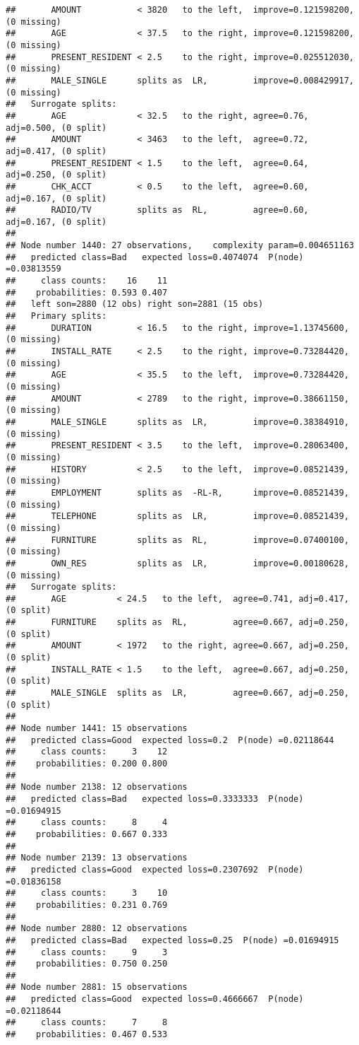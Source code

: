 \documentclass[
]{article}
\begin{document}
\begin{verbatim}
##       AMOUNT           < 3820   to the left,  improve=0.121598200, (0 missing)
##       AGE              < 37.5   to the right, improve=0.121598200, (0 missing)
##       PRESENT_RESIDENT < 2.5    to the right, improve=0.025512030, (0 missing)
##       MALE_SINGLE      splits as  LR,         improve=0.008429917, (0 missing)
##   Surrogate splits:
##       AGE              < 32.5   to the right, agree=0.76, adj=0.500, (0 split)
##       AMOUNT           < 3463   to the left,  agree=0.72, adj=0.417, (0 split)
##       PRESENT_RESIDENT < 1.5    to the left,  agree=0.64, adj=0.250, (0 split)
##       CHK_ACCT         < 0.5    to the left,  agree=0.60, adj=0.167, (0 split)
##       RADIO/TV         splits as  RL,         agree=0.60, adj=0.167, (0 split)
## 
## Node number 1440: 27 observations,    complexity param=0.004651163
##   predicted class=Bad   expected loss=0.4074074  P(node) =0.03813559
##     class counts:    16    11
##    probabilities: 0.593 0.407 
##   left son=2880 (12 obs) right son=2881 (15 obs)
##   Primary splits:
##       DURATION         < 16.5   to the right, improve=1.13745600, (0 missing)
##       INSTALL_RATE     < 2.5    to the right, improve=0.73284420, (0 missing)
##       AGE              < 35.5   to the left,  improve=0.73284420, (0 missing)
##       AMOUNT           < 2789   to the right, improve=0.38661150, (0 missing)
##       MALE_SINGLE      splits as  LR,         improve=0.38384910, (0 missing)
##       PRESENT_RESIDENT < 3.5    to the left,  improve=0.28063400, (0 missing)
##       HISTORY          < 2.5    to the left,  improve=0.08521439, (0 missing)
##       EMPLOYMENT       splits as  -RL-R,      improve=0.08521439, (0 missing)
##       TELEPHONE        splits as  LR,         improve=0.08521439, (0 missing)
##       FURNITURE        splits as  RL,         improve=0.07400100, (0 missing)
##       OWN_RES          splits as  LR,         improve=0.00180628, (0 missing)
##   Surrogate splits:
##       AGE          < 24.5   to the left,  agree=0.741, adj=0.417, (0 split)
##       FURNITURE    splits as  RL,         agree=0.667, adj=0.250, (0 split)
##       AMOUNT       < 1972   to the right, agree=0.667, adj=0.250, (0 split)
##       INSTALL_RATE < 1.5    to the left,  agree=0.667, adj=0.250, (0 split)
##       MALE_SINGLE  splits as  LR,         agree=0.667, adj=0.250, (0 split)
## 
## Node number 1441: 15 observations
##   predicted class=Good  expected loss=0.2  P(node) =0.02118644
##     class counts:     3    12
##    probabilities: 0.200 0.800 
## 
## Node number 2138: 12 observations
##   predicted class=Bad   expected loss=0.3333333  P(node) =0.01694915
##     class counts:     8     4
##    probabilities: 0.667 0.333 
## 
## Node number 2139: 13 observations
##   predicted class=Good  expected loss=0.2307692  P(node) =0.01836158
##     class counts:     3    10
##    probabilities: 0.231 0.769 
## 
## Node number 2880: 12 observations
##   predicted class=Bad   expected loss=0.25  P(node) =0.01694915
##     class counts:     9     3
##    probabilities: 0.750 0.250 
## 
## Node number 2881: 15 observations
##   predicted class=Good  expected loss=0.4666667  P(node) =0.02118644
##     class counts:     7     8
##    probabilities: 0.467 0.533
\end{verbatim}
\end{document}
